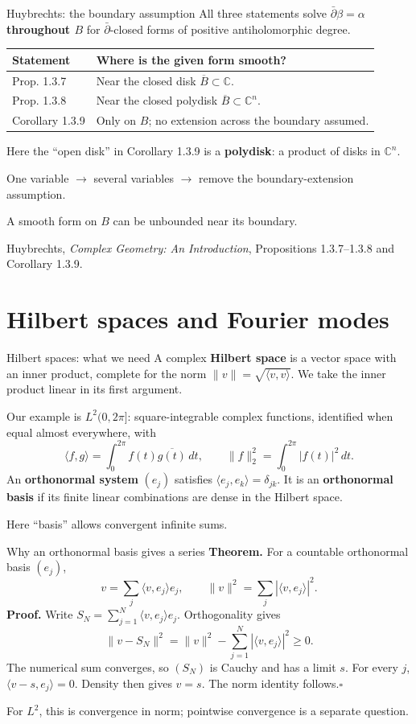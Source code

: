 \documentclass[aspectratio=169,11pt]{beamer}
\newcommand{\db}{\bar\partial}
\newcommand{\C}{\mathbb C}
\newcommand{\src}[1]{\par\vfill{\scriptsize #1\par}}
\begin{document}
\begin{frame}{Huybrechts: the boundary assumption}
All three statements solve $\db\beta=\alpha$ \textbf{throughout $B$}
for $\db$-closed forms of positive antiholomorphic degree.

\medskip
\renewcommand{\arraystretch}{1.45}
\begin{tabular}{@{}p{2.5cm}p{9.8cm}@{}}
\textbf{Statement}&\textbf{Where is the given form smooth?}\\\hline
Prop. 1.3.7&Near the closed disk $\overline B\subset\C$.\\
Prop. 1.3.8&Near the closed polydisk $\overline B\subset\C^n$.\\
Corollary 1.3.9&Only on $B$; no extension across the boundary assumed.
\end{tabular}
\medskip

Here the ``open disk'' in Corollary 1.3.9 is a \textbf{polydisk}:
a product of disks in $\C^n$.

One variable $\longrightarrow$ several variables
$\longrightarrow$ remove the boundary-extension assumption.

A smooth form on $B$ can be unbounded near its boundary.
\src{Huybrechts, \emph{Complex Geometry: An Introduction},\newline
Propositions 1.3.7--1.3.8 and Corollary 1.3.9.}
\end{frame}

\section{Hilbert spaces and Fourier modes}
\begin{frame}{Hilbert spaces: what we need}
A complex \textbf{Hilbert space} is a vector space with an inner product,
complete for the norm $\|v\|=\sqrt{\langle v,v\rangle}$.
We take the inner product linear in its first argument.

Our example is $L^2(0,2\pi]$: square-integrable complex functions,
identified when equal almost everywhere, with
\[
 \langle f,g\rangle=\int_0^{2\pi}f(t)\overline{g(t)}\,dt,
 \qquad \|f\|_2^2=\int_0^{2\pi}|f(t)|^2\,dt.
\]
An \textbf{orthonormal system} $(e_j)$ satisfies
$\langle e_j,e_k\rangle=\delta_{jk}$.
It is an \textbf{orthonormal basis} if its finite linear combinations
are dense in the Hilbert space.

Here ``basis'' allows convergent infinite sums.
\end{frame}

\begin{frame}{Why an orthonormal basis gives a series}
\textbf{Theorem.} For a countable orthonormal basis $(e_j)$,
\[
 v=\sum_j\langle v,e_j\rangle e_j,
 \qquad \|v\|^2=\sum_j|\langle v,e_j\rangle|^2.
\]
\textbf{Proof.} Write $S_N=\sum_{j=1}^N\langle v,e_j\rangle e_j$.
Orthogonality gives
\[
 \|v-S_N\|^2=\|v\|^2-\sum_{j=1}^N|\langle v,e_j\rangle|^2\geq0.
\]
The numerical sum converges, so $(S_N)$ is Cauchy and has a limit $s$.
For every $j$, $\langle v-s,e_j\rangle=0$.
Density then gives $v=s$. The norm identity follows.\hfill$\square$

For $L^2$, this is convergence in norm; pointwise convergence is a
separate question.
\end{frame}
\end{document}
